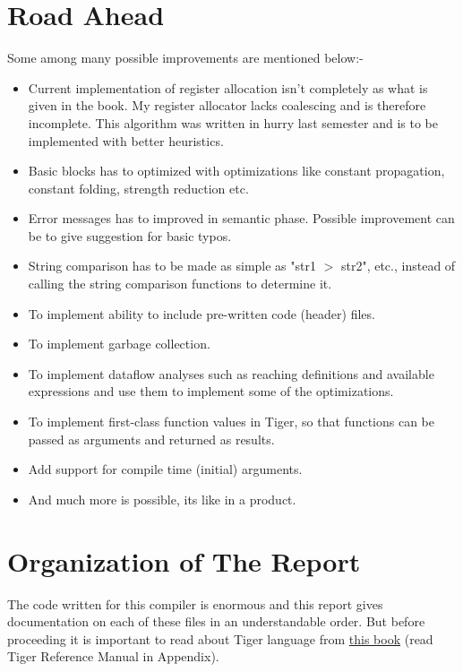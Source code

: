 \section{Road Ahead}

Some among many possible improvements are mentioned below:-

\begin{itemize}
  \item Current implementation of register allocation isn't completely as what is given in the book. My register allocator lacks coalescing and is therefore incomplete. This algorithm was written in hurry last semester and is to be implemented with better heuristics.
  \item Basic blocks has to optimized with optimizations like constant propagation, constant folding, strength reduction etc.
  \item Error messages has to improved in semantic phase. Possible improvement can be to give suggestion for basic typos. 
  \item String comparison has to be made as simple as "str1 $>$ str2", etc.,  instead of calling the string comparison functions to determine it.
  \item To implement ability to include pre-written code (header) files.
  \item To implement garbage collection.
  \item To implement dataflow analyses such as reaching definitions and available expressions and use them to implement some of the optimizations. 
  \item To implement first-class function values in Tiger, so that functions can be passed as arguments and returned as results.
  \item Add support for compile time (initial) arguments.
  \item And much more is possible, its like in a product.
\end{itemize}

\section{Organization of The Report}

The code written for this compiler is enormous and this report gives documentation on each of these files in an understandable order. But before proceeding it is important to read about Tiger language from \href{https://www.cs.princeton.edu/~appel/modern/ml/}{this book} (read Tiger Reference Manual in Appendix). 

